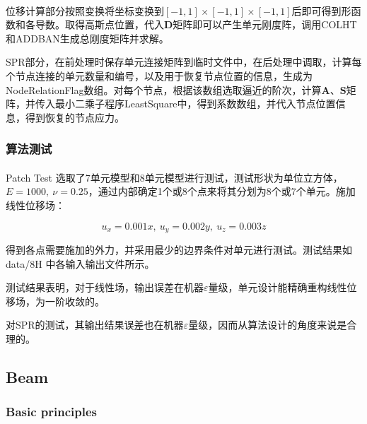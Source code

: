 \documentclass[UTF8]{ctexbook}
\begin{document}
\paragraph{}

位移计算部分按照变换将坐标变换到$[-1,1]\times[-1,1]\times[-1,1]$后即可得到形函数和各导数。取得高斯点位置，代入$\boldsymbol{D}$矩阵即可以产生单元刚度阵，调用COLHT和ADDBAN生成总刚度矩阵并求解。


SPR部分，在前处理时保存单元连接矩阵到临时文件中，在后处理中调取，计算每个节点连接的单元数量和编号，以及用于恢复节点位置的信息，生成为NodeRelationFlag数组。对每个节点，根据该数组选取逼近的阶次，计算$\boldsymbol{A}\text{、}\boldsymbol{S}$矩阵，并传入最小二乘子程序LeastSquare中，得到系数数组，并代入节点位置信息，得到恢复的节点应力。

\subsubsection{算法测试}
\paragraph{}

Patch Test 选取了7单元模型和8单元模型进行测试，测试形状为单位立方体，$E=1000,\ \nu=0.25$，通过内部确定1个或8个点来将其分划为8个或7个单元。施加线性位移场：


\[
u_{x}=0.001x,\ u_{y}=0.002y,\ u_{z}=0.003z
\]



得到各点需要施加的外力，并采用最少的边界条件对单元进行测试。测试结果如 data/8H 中各输入输出文件所示。


测试结果表明，对于线性场，输出误差在机器$\varepsilon$量级，单元设计能精确重构线性位移场，为一阶收敛的。


对SPR的测试，其输出结果误差也在机器$\varepsilon$量级，因而从算法设计的角度来说是合理的。



\subsection{Beam}
\subsubsection{Basic principles}
\end{document}
